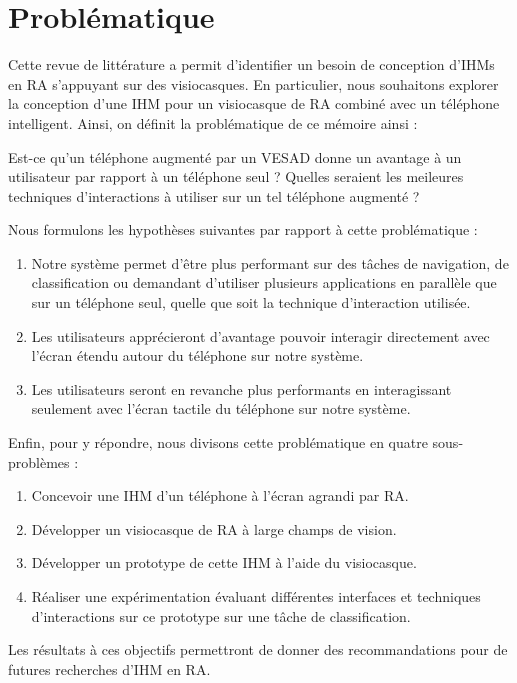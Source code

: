

\section{Problématique}
Cette revue de littérature a permit d'identifier un besoin de conception d'IHMs en RA s'appuyant sur des visiocasques. En particulier, nous souhaitons explorer la conception d'une IHM pour un visiocasque de RA combiné avec un téléphone intelligent. Ainsi, on définit la problématique de ce mémoire ainsi :

\begin{displayquote}
  Est-ce qu'un téléphone augmenté par un VESAD donne un avantage à un utilisateur par rapport à un téléphone seul ? Quelles seraient les meileures techniques d'interactions à utiliser sur un tel téléphone augmenté ?
\end{displayquote}

Nous formulons les hypothèses suivantes par rapport à cette problématique :
\begin{enumerate}[label={(H\arabic*)}]
  \item Notre système	permet d'être plus performant sur des tâches de navigation, de classification ou demandant d'utiliser plusieurs applications en parallèle que sur un téléphone seul, quelle que soit la technique d'interaction utilisée.
  \item Les utilisateurs apprécieront d'avantage pouvoir interagir directement avec l'écran étendu autour du téléphone sur notre système.
  \item Les utilisateurs seront en revanche plus performants en interagissant seulement avec l'écran tactile du téléphone sur notre système.
\end{enumerate}

Enfin, pour y répondre, nous divisons cette problématique en quatre sous-problèmes :
\begin{enumerate}
  \item Concevoir une IHM d'un téléphone à l'écran agrandi par RA.
  \item Développer un visiocasque de RA à large champs de vision.
  \item Développer un prototype de cette IHM à l'aide du visiocasque.
  \item Réaliser une expérimentation évaluant différentes interfaces et techniques d'interactions sur ce prototype sur une tâche de classification.
\end{enumerate}

Les résultats à ces objectifs permettront de donner des recommandations pour de futures recherches d'IHM en RA.